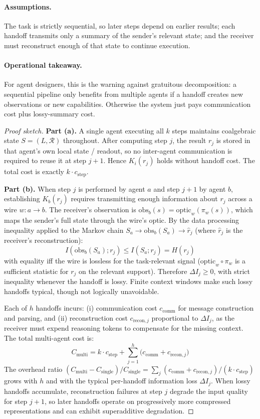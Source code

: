 \paragraph{Assumptions.}
The task is strictly sequential, so later steps depend on earlier results; each handoff transmits only a summary of the sender's relevant state; and the receiver must reconstruct enough of that state to continue execution.

\paragraph{Operational takeaway.}
For agent designers, this is the warning against gratuitous decomposition: a sequential pipeline only benefits from multiple agents if a handoff creates new observations or new capabilities. Otherwise the system just pays communication cost plus lossy-summary cost.

\begin{proof}[Proof sketch]
\textbf{Part (a).} A single agent executing all $k$ steps maintains coalgebraic state $S = (L, \mathcal{R})$ throughout. After computing step $j$, the result $r_j$ is stored in that agent's own local state / readout, so no inter-agent communication is required to reuse it at step $j+1$. Hence $K_i(r_j)$ holds without handoff cost. The total cost is exactly $k \cdot c_{\mathrm{step}}$.

\textbf{Part (b).} When step $j$ is performed by agent $a$ and step $j+1$ by agent $b$, establishing $K_b(r_j)$ requires transmitting enough information about $r_j$ across a wire $w: a \to b$. The receiver's observation is $\mathrm{obs}_b(s) = \mathrm{optic}_w(\pi_w(s))$, which maps the sender's full state through the wire's optic. By the data processing inequality applied to the Markov chain $S_a \to \mathrm{obs}_b(S_a) \to \hat{r}_j$ (where $\hat{r}_j$ is the receiver's reconstruction):
\[
I(\mathrm{obs}_b(S_a); r_j) \le I(S_a; r_j) = H(r_j)
\]
with equality iff the wire is lossless for the task-relevant signal ($\mathrm{optic}_w \circ \pi_w$ is a sufficient statistic for $r_j$ on the relevant support). Therefore $\Delta I_j \ge 0$, with strict inequality whenever the handoff is lossy. Finite context windows make such lossy handoffs typical, though not logically unavoidable.

Each of $h$ handoffs incurs: (i) communication cost $c_{\mathrm{comm}}$ for message construction and parsing, and (ii) reconstruction cost $c_{\mathrm{recon},j}$ proportional to $\Delta I_j$, as the receiver must expend reasoning tokens to compensate for the missing context. The total multi-agent cost is:
\[
C_{\mathrm{multi}} = k \cdot c_{\mathrm{step}} + \sum_{j=1}^{h} \bigl(c_{\mathrm{comm}} + c_{\mathrm{recon},j}\bigr)
\]
The overhead ratio $(C_{\mathrm{multi}} - C_{\mathrm{single}})/C_{\mathrm{single}} = \sum_j (c_{\mathrm{comm}} + c_{\mathrm{recon},j}) / (k \cdot c_{\mathrm{step}})$ grows with $h$ and with the typical per-handoff information loss $\Delta I_j$. When lossy handoffs accumulate, reconstruction failures at step $j$ degrade the input quality for step $j+1$, so later handoffs operate on progressively more compressed representations and can exhibit superadditive degradation.
\end{proof}

